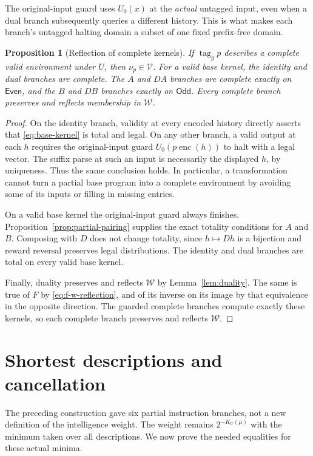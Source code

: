 \documentclass[11pt]{article}
\newtheorem{proposition}[theorem]{Proposition}
\theoremstyle{definition}
\theoremstyle{remark}
\newcommand{\V}{\mathcal V}
\newcommand{\W}{\mathcal W}
\newcommand{\enc}{\operatorname{enc}}
\newcommand{\tagword}{\operatorname{tag}}
\begin{document}
The original-input guard uses $U_0(x)$ at the \emph{actual} untagged
input, even when a dual branch subsequently queries a different
history.  This is what makes each branch's untagged halting domain
a subset of one fixed prefix-free domain.

\begin{proposition}[Reflection of complete kernels]
\label{prop:totality-reflection}
If $\tagword_g p$ describes a complete valid environment under $U$,
then $\nu_p\in\V$.  For a valid base kernel, the identity and dual
branches are complete.  The $A$ and $DA$ branches are complete
exactly on $\mathsf{Even}$, and the $B$ and $DB$ branches exactly
on $\mathsf{Odd}$.  Every complete branch preserves and reflects
membership in $\W$.
\end{proposition}

\begin{proof}
On the identity branch, validity at every encoded history directly
asserts that \eqref{eq:base-kernel} is total and legal.  On any
other branch, a valid output at each $h$ requires the original-input
guard $U_0(p\enc(h))$ to halt with a legal vector.  The suffix
parse at such an input is necessarily the displayed $h$, by
uniqueness.  Thus the same conclusion holds.  In particular, a
transformation cannot turn a partial base program into a complete
environment by avoiding some of its inputs or filling in missing
entries.

On a valid base kernel the original-input guard always finishes.
Proposition~\ref{prop:partial-pairing} supplies the exact totality
conditions for $A$ and $B$.  Composing with $D$ does not change
totality, since $h\mapsto Dh$ is a bijection and reward reversal
preserves legal distributions.  The identity and dual branches
are total on every valid base kernel.

Finally, duality preserves and reflects $\W$ by
Lemma~\ref{lem:duality}.  The same is true of $F$ by
\eqref{eq:f-w-reflection}, and of its inverse on its image by that
equivalence in the opposite direction.  The guarded complete
branches compute exactly these kernels, so each complete branch
preserves and reflects $\W$.
\end{proof}

\section{Shortest descriptions and cancellation}
\label{sec:cancellation}

The preceding construction gave six partial instruction branches,
not a new definition of the intelligence weight.  The weight remains
$2^{-K_U(\mu)}$ with the minimum taken over all descriptions.
We now prove the needed equalities for these actual minima.
\end{document}
